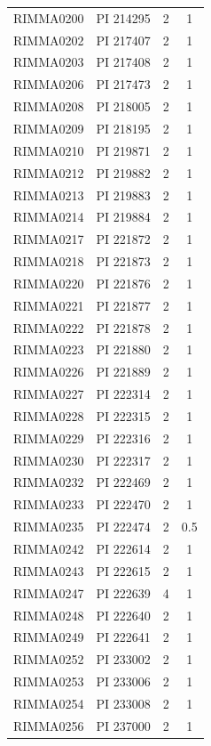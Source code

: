 \documentclass[11pt]{article}
\newcounter{rowno}
\begin{document}
\begin{scriptsize}
\begin{longtable}{>{\stepcounter{rowno}}cccc}
    RIMMA0200 & PI	214295 & 2     & 1 \\
    RIMMA0202 & PI	217407 & 2     & 1 \\
    RIMMA0203 & PI	217408 & 2     & 1 \\
    RIMMA0206 & PI	217473 & 2     & 1 \\
    RIMMA0208 & PI	218005 & 2     & 1 \\
    RIMMA0209 & PI	218195 & 2     & 1 \\
    RIMMA0210 & PI 219871 & 2     & 1 \\
    RIMMA0212 & PI 219882 & 2     & 1 \\
    RIMMA0213 & PI 219883 & 2     & 1 \\
    RIMMA0214 & PI 219884 & 2     & 1 \\
    RIMMA0217 & PI 221872 & 2     & 1 \\
    RIMMA0218 & PI 221873 & 2     & 1 \\
    RIMMA0220 & PI 221876 & 2     & 1 \\
    RIMMA0221 & PI 221877 & 2     & 1 \\
    RIMMA0222 & PI 221878 & 2     & 1 \\
    RIMMA0223 & PI	221880 & 2     & 1 \\
    RIMMA0226 & PI	221889 & 2     & 1 \\
    RIMMA0227 & PI	222314 & 2     & 1 \\
    RIMMA0228 & PI	222315 & 2     & 1 \\
    RIMMA0229 & PI	222316 & 2     & 1 \\
    RIMMA0230 & PI	222317 & 2     & 1 \\
    RIMMA0232 & PI	222469 &  2     & 1 \\
    RIMMA0233 & PI	222470 & 2     & 1 \\
    RIMMA0235 & PI	222474 & 2     & 0.5 \\
    RIMMA0242 & PI	222614 & 2     & 1 \\
    RIMMA0243 & PI	222615 & 2     & 1 \\
    RIMMA0247 & PI	222639 & 4     & 1 \\
    RIMMA0248 & PI	222640 & 2     & 1 \\
    RIMMA0249 & PI	222641 & 2     & 1 \\
    RIMMA0252 & PI	233002 & 2     & 1 \\
    RIMMA0253 & PI	233006 & 2     & 1 \\
    RIMMA0254 & PI	233008 & 2     & 1 \\
    RIMMA0256 & PI	237000 & 2     & 1 \\

\end{longtable}
\end{scriptsize}
\end{document}
